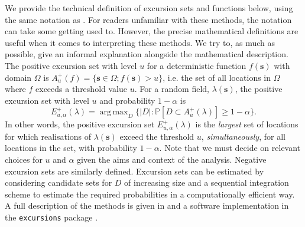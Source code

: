 \documentclass{statsoc}
\newcommand{\bs}{\mathbf{s}}
\DeclareMathOperator*{\argmax}{arg\,max}  %
\begin{document}
We provide the technical definition of excursion sets and functions below, using the same notation as \cite{bolin_excursion_2015}.  For readers unfamiliar with these methods, the notation can take some getting used to.  However, the precise mathematical definitions are useful when it comes to interpreting these methods.  We try to, as much as possible, give an informal explanation alongside the mathematical description.  The positive excursion set with level $u$ for a deterministic function $f(\bs)$ with domain $\Omega$ is $A_u^{+}(f) = \{ \bs \in \Omega ; f(\bs) > u \}$, i.e. the set of all locations in $\Omega$ where $f$ exceeds a threshold value $u$. For a random field, $\lambda(\bs)$, the positive excursion set with level $u$ and probability $1 - \alpha$ is
\begin{equation*}
E_{u,\alpha}^{+}(\lambda) = \argmax_{D}\{\lvert D \rvert : \mathbb{P}\left[D \subset A_u^{+}(\lambda)\right] \geq 1 - \alpha \} .
\end{equation*}
In other words, the positive excursion set $E_{u,\alpha}^{+}(\lambda)$ is the \textit{largest} set of locations for which realisations of $\lambda(\bs)$ exceed the threshold $u$, \textit{simultaneously}, for all locations in the set, with probability $1-\alpha$.  Note that we must decide on relevant choices for $u$ and $\alpha$ given the aims and context of the analysis.  Negative excursion sets are similarly defined.  Excursion sets can be estimated by considering candidate sets for $D$ of increasing size and a sequential integration scheme to estimate the required probabilities in a computationally efficient way.  A full description of the methods is given in \cite{bolin_excursion_2015} and a software implementation in the \texttt{excursions} package \citep{bolin_calculating_2018}.  
\end{document}
